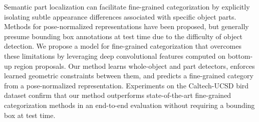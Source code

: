 

Semantic part localization can facilitate fine-grained categorization by explicitly isolating subtle appearance differences associated with specific object parts.  Methods for pose-normalized representations have been proposed, but generally presume bounding box annotations at test time due to the difficulty of object detection. We propose a model for fine-grained categorization that overcomes these limitations by leveraging deep convolutional features computed on bottom-up region proposals. Our method learns whole-object and part detectors, enforces learned geometric constraints between them, and predicts a fine-grained category from a pose-normalized representation.
Experiments on the Caltech-UCSD bird dataset confirm that our method outperforms state-of-the-art fine-grained categorization methods in an end-to-end evaluation without requiring a bounding box at test time.
